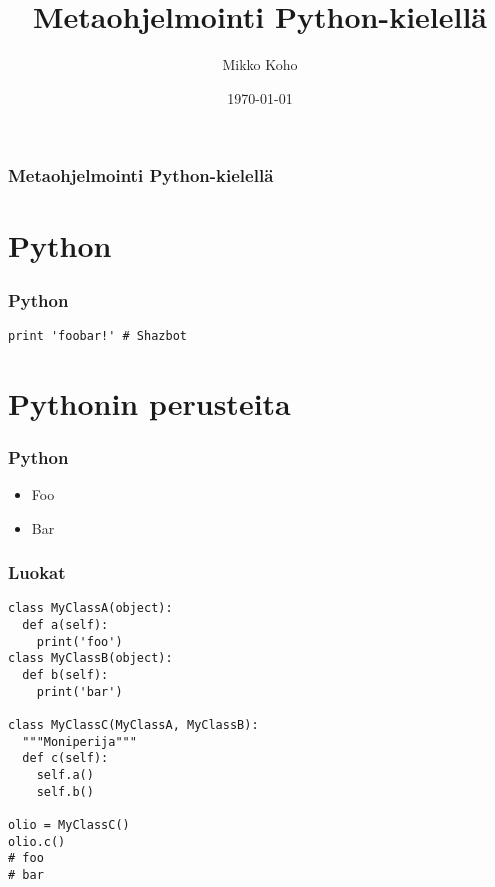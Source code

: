 \documentclass{beamer}
\title{Metaohjelmointi Python-kielellä}
\author{Mikko Koho}
\institute{Helsingin Yliopisto}
\date{\today}
\begin{document}
{
\begin{frame}
\maketitle
\end{frame}
}


\begin{frame}
  \frametitle{Metaohjelmointi Python-kielellä}
  \tableofcontents%
\end{frame}

\section{Python}

\begin{frame}[fragile]
\frametitle{Python}
\begin{verbatim}
print 'foobar!' # Shazbot
\end{verbatim}
\end{frame}

\section{Pythonin perusteita}

\begin{frame}[fragile]
\frametitle{Python}
\begin{itemize}
\item{Foo}
\item{Bar}
\end{itemize}
\end{frame}


\begin{frame}[fragile]
\frametitle{Luokat}
\begin{verbatim}
class MyClassA(object):
  def a(self):
    print('foo')
class MyClassB(object):
  def b(self):
    print('bar')

class MyClassC(MyClassA, MyClassB):
  """Moniperija"""
  def c(self):
    self.a()
    self.b()

olio = MyClassC()
olio.c()
# foo
# bar
\end{verbatim}
\end{frame}
\end{document}
